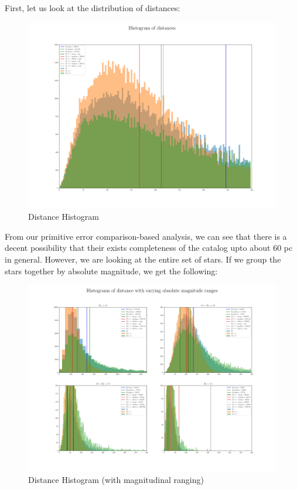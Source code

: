 \documentclass{business-covered} %
\begin{document}
		First, let us look at the distribution of distances:
		\begin{figure}[h!]
			\includegraphics[scale=.33]{figures/dist_hist_base.png}
			\caption{Distance Histogram}
		\end{figure}
		
		From our primitive error comparison-based analysis, we can see that there is a decent possibility that their exists completeness of the catalog upto about 60 pc in general. However, we are looking at the entire set of stars. If we group the stars together by absolute magnitude, we get the following:
		
		\begin{figure}[h!]
			\includegraphics[scale=.33]{figures/dist_hist.png}
			\caption{Distance Histogram (with magnitudinal ranging)}
		\end{figure}
		
\end{document}
